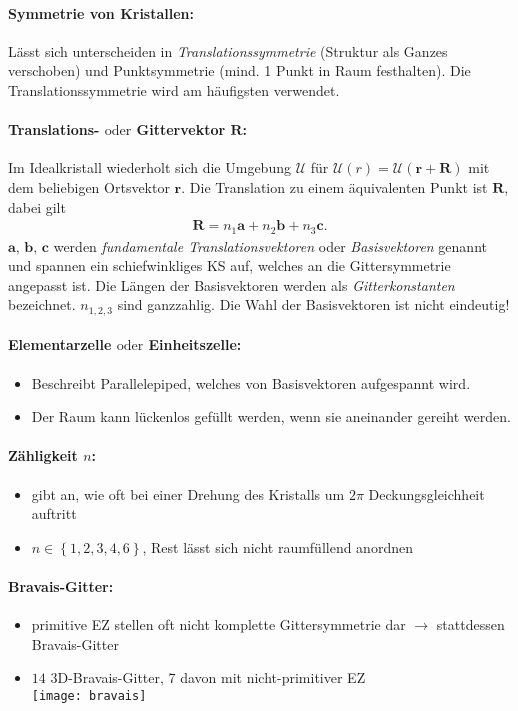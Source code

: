 \documentclass[a4paper,12pt]{article}
\begin{document}
\paragraph*{Symmetrie von Kristallen:} Lässt sich unterscheiden in \emph{Translationssymmetrie} (Struktur als Ganzes verschoben) und Punktsymmetrie (mind. 1 Punkt in Raum festhalten). Die Translationssymmetrie wird am häufigsten verwendet.
\paragraph*{Translations- $\mathrm{oder}$ Gittervektor $ \textbf{R} $:} Im Idealkristall wiederholt sich die Umgebung $ \mathcal U $ für $ \mathcal U(r) = \mathcal{U} (\textbf{r}+\textbf{R})$ mit dem beliebigen Ortsvektor $ \textbf{r} $. Die Translation zu einem äquivalenten Punkt ist $ \textbf{R} $, dabei gilt \begin{align*}
\textbf{R} = n_1 \textbf{a} + n_2 \textbf{b} + n_3 \textbf{c}\mathrm{.}
\end{align*}
$ \textbf{a, b, c} $ werden \emph{fundamentale Translationsvektoren} oder \emph{Basisvektoren} genannt und spannen ein schiefwinkliges KS auf, welches an die Gittersymmetrie angepasst ist. Die Längen der Basisvektoren werden als \emph{Gitterkonstanten} bezeichnet. $ n_{1,2,3} $ sind ganzzahlig. Die Wahl der Basisvektoren ist nicht eindeutig!
\paragraph*{Elementarzelle $\mathrm{oder}$ Einheitszelle:} \begin{itemize}
	\item Beschreibt Parallelepiped, welches von Basisvektoren aufgespannt wird.
	\item Der Raum kann lückenlos gefüllt werden, wenn sie aneinander gereiht werden.
\end{itemize}
\paragraph*{Zähligkeit $ n $:}\begin{itemize}
	\item gibt an, wie oft bei einer Drehung des Kristalls um $ 2\pi $ Deckungsgleichheit auftritt
	\item $ n\in \left\{1,2,3,4,6\right\} $, Rest lässt sich nicht raumfüllend anordnen
\end{itemize}
\paragraph*{Bravais-Gitter:}
\begin{itemize}
	\item primitive EZ stellen oft nicht komplette Gittersymmetrie dar $ \rightarrow $ stattdessen Bravais-Gitter
	\item $ 14  $ 3D-Bravais-Gitter, 7 davon mit nicht-primitiver EZ\\
	\texttt{[image: bravais]}
\end{itemize}
\end{document}
